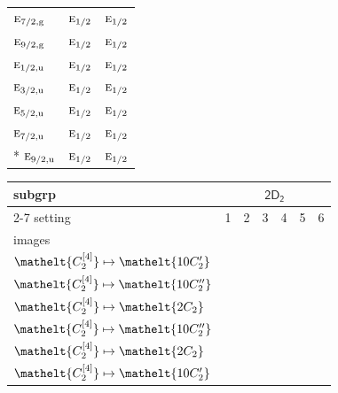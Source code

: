 \documentclass[10pt,a4paper]{article}
\numberwithin{equation}{section}
\newcommand{\eltfont}[1]{{\let\sigma\eltsigma\mathelt{#1}}}
\newcommand{\grp}[1]{\mathsf{#1}}
\newcommand{\irr}[1]{\text{\normalfont\scshape #1}}
\newcommand{\cls}[1]{\eltfont{#1}}
\newcommand{\ptag}[1]{\mathrm{#1}}
\newcommand{\genidx}[2]{#1^{[\mathrm{#2}]}}
\begin{document}
{\begin{longtable}{@{}lcc@{}}
$\irr{e}_{7/2,\ptag{g}}$ & $\irr{e}_{1/2}$ & $\irr{e}_{1/2}$\\
$\irr{e}_{9/2,\ptag{g}}$ & $\irr{e}_{1/2}$ & $\irr{e}_{1/2}$\\
$\irr{e}_{1/2,\ptag{u}}$ & $\irr{e}_{1/2}$ & $\irr{e}_{1/2}$\\
$\irr{e}_{3/2,\ptag{u}}$ & $\irr{e}_{1/2}$ & $\irr{e}_{1/2}$\\
$\irr{e}_{5/2,\ptag{u}}$ & $\irr{e}_{1/2}$ & $\irr{e}_{1/2}$\\
$\irr{e}_{7/2,\ptag{u}}$ & $\irr{e}_{1/2}$ & $\irr{e}_{1/2}$\\*
$\irr{e}_{9/2,\ptag{u}}$ & $\irr{e}_{1/2}$ & $\irr{e}_{1/2}$\\
\bottomrule\end{longtable}}
{\small\begin{longtable}{@{}lcccccc@{}}\toprule
subgrp & \multicolumn{6}{c}{\href{2D2.pdf}{$\grp{2D_{2}}$}}\\\cmidrule(lr){2-7}
setting & 1 & 2 & 3 & 4 & 5 & 6\\
images & {\scriptsize\begin{tabular}[t]{@{}c@{}}$\cls{\genidx{C_{2}}{2}} \mapsto \cls{2C_{2}}$\\$\cls{\genidx{C_{2}}{4}} \mapsto \cls{10C_{2}'}$\end{tabular}} & {\scriptsize\begin{tabular}[t]{@{}c@{}}$\cls{\genidx{C_{2}}{2}} \mapsto \cls{2C_{2}}$\\$\cls{\genidx{C_{2}}{4}} \mapsto \cls{10C_{2}''}$\end{tabular}} & {\scriptsize\begin{tabular}[t]{@{}c@{}}$\cls{\genidx{C_{2}}{2}} \mapsto \cls{10C_{2}'}$\\$\cls{\genidx{C_{2}}{4}} \mapsto \cls{2C_{2}}$\end{tabular}} & {\scriptsize\begin{tabular}[t]{@{}c@{}}$\cls{\genidx{C_{2}}{2}} \mapsto \cls{10C_{2}'}$\\$\cls{\genidx{C_{2}}{4}} \mapsto \cls{10C_{2}''}$\end{tabular}} & {\scriptsize\begin{tabular}[t]{@{}c@{}}$\cls{\genidx{C_{2}}{2}} \mapsto \cls{10C_{2}''}$\\$\cls{\genidx{C_{2}}{4}} \mapsto \cls{2C_{2}}$\end{tabular}} & {\scriptsize\begin{tabular}[t]{@{}c@{}}$\cls{\genidx{C_{2}}{2}} \mapsto \cls{10C_{2}''}$\\$\cls{\genidx{C_{2}}{4}} \mapsto \cls{10C_{2}'}$\end{tabular}}\\\midrule\endhead

\end{longtable}}
\end{document}
